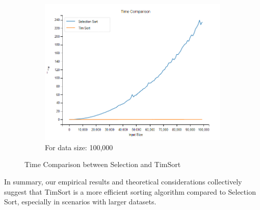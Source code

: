 \documentclass[twocolumn]{article}
\begin{document}
\begin{multicols}{2}
\begin{figure}[h]
\begin{subfigure}{0.4\textwidth}
            \includegraphics[width=\linewidth]{Images/100k_time_comp.png}
            \caption{For data size: 100,000}
            \label{d100k}
        \end{subfigure}
        \caption{Time Comparison between Selection and TimSort}
        \label{fig:theoretical_complexities}
    \end{figure}

    In summary, our empirical results and theoretical considerations collectively suggest that TimSort is a more efficient sorting algorithm compared to Selection Sort, especially in scenarios with larger datasets.
\end{multicols}
\end{document}
